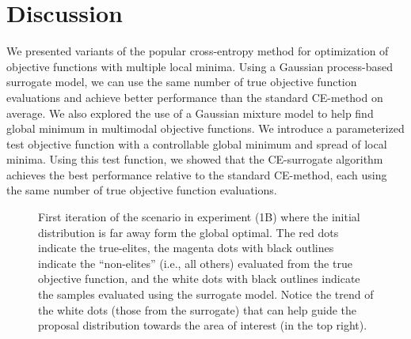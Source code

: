 \section{Discussion} \label{sec:cem_discussion}
We presented variants of the popular cross-entropy method for optimization of objective functions with multiple local minima.
Using a Gaussian process-based surrogate model, we can use the same number of true objective function evaluations and achieve better performance than the standard CE-method on average.
We also explored the use of a Gaussian mixture model to help find global minimum in multimodal objective functions.
We introduce a parameterized test objective function with a controllable global minimum and spread of local minima.
Using this test function, we showed that the CE-surrogate algorithm achieves the best performance relative to the standard CE-method, each using the same number of true objective function evaluations.


\begin{figure}[!h]
  \centering
  \resizebox{0.6\columnwidth}{!}{}
  \caption{
    \label{fig:example_1b}
    First iteration of the scenario in experiment (1B) where the initial distribution is far away form the global optimal. The red dots indicate the true-elites, the magenta dots with black outlines indicate the ``non-elites'' (i.e., all others) evaluated from the true objective function, and the white dots with black outlines indicate the samples evaluated using the surrogate model. Notice the trend of the white dots (those from the surrogate) that can help guide the proposal distribution towards the area of interest (in the top right).
  }
\end{figure}

